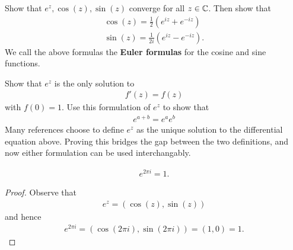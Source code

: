 \documentclass{memoir}
\begin{document}
\begin{hw}
	Show that \(e^{z}, \cos(z), \sin(z)\) converge for all \(z \in \mathbb{C}\). Then show that
	\begin{align*}
		\cos(z) = \frac{1}{2}\left( e^{iz} + e^{-iz} \right) \\
		\sin(z) = \frac{1}{2i} \left( e^{iz} - e^{-iz} \right) .
	\end{align*}
	We call the above formulas the \textbf{Euler formulas} for the cosine and sine functions.
\end{hw}

\begin{hw}
	Show that \(e^{z}\) is the only solution to
	\begin{align*}
		f'(z) = f(z)
	\end{align*}
	with \(f(0) = 1\). Use this formulation of \(e^{z}\) to show that
	\begin{align*}
		e^{a+b} = e^{a}e^{b}
	\end{align*}
	Many references choose to define \(e^{z}\) as the unique solution to the differential equation above. Proving this bridges the gap between the two definitions, and now either formulation can be used interchangably.
\end{hw}

\begin{prop}
	\begin{align*}
		e^{2 \pi i} = 1.
	\end{align*}
\end{prop}
\begin{proof}
	Observe that
	\begin{align*}
		e^{z} = (\cos(z),\sin(z))
	\end{align*}
	and hence
	\begin{align*}
		e^{2\pi i} = \left( \cos(2\pi i), \sin(2\pi i) \right) = \left( 1,0 \right) = 1.
	\end{align*}
\end{proof}
\end{document}
